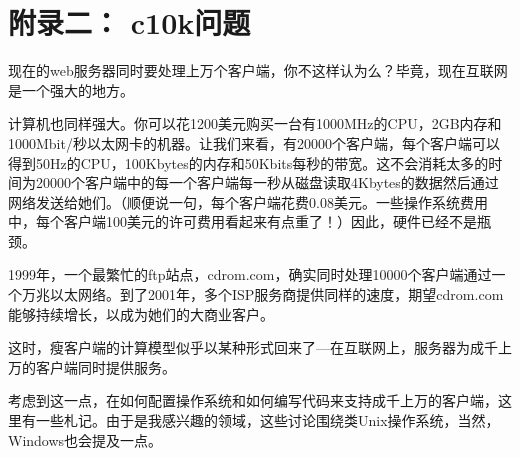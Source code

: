 \documentclass[12pt, twoside, a4paper, xetex]{report}
\begin{document}
\chapter{附录二： c10k问题}
	现在的web服务器同时要处理上万个客户端，你不这样认为么？毕竟，现在互联网是一个强大的地方。
	
	计算机也同样强大。你可以花1200美元购买一台有1000MHz的CPU，2GB内存和1000Mbit/秒以太网卡的机器。让我们来看，有20000个客户端，每个客户端可以得到50Hz的CPU，100Kbytes的内存和50Kbits每秒的带宽。这不会消耗太多的时间为20000个客户端中的每一个客户端每一秒从磁盘读取4Kbytes的数据然后通过网络发送给她们。（顺便说一句，每个客户端花费0.08美元。一些操作系统费用中，每个客户端100美元的许可费用看起来有点重了！）因此，硬件已经不是瓶颈。
	
	1999年，一个最繁忙的ftp站点，cdrom.com，确实同时处理10000个客户端通过一个万兆以太网络。到了2001年，多个ISP服务商提供同样的速度，期望cdrom.com能够持续增长，以成为她们的大商业客户。
	
	这时，瘦客户端的计算模型似乎以某种形式回来了---在互联网上，服务器为成千上万的客户端同时提供服务。
	
	考虑到这一点，在如何配置操作系统和如何编写代码来支持成千上万的客户端，这里有一些札记。由于是我感兴趣的领域，这些讨论围绕类Unix操作系统，当然，Windows也会提及一点。	
\end{document}
